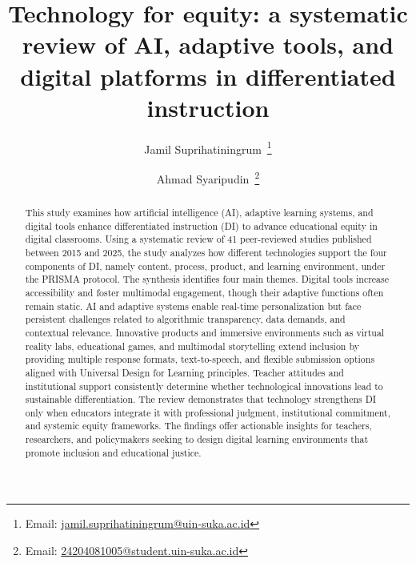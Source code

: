 \documentclass[english]{textolivre}
\title{Technology for equity: a systematic review of AI, adaptive tools, and digital platforms in differentiated instruction}
\author[1]{Jamil Suprihatiningrum~\orcid{0000-0002-1836-8845}\thanks{Email: \href{mailto:jamil.suprihatiningrum@uin-suka.ac.id}{jamil.suprihatiningrum@uin-suka.ac.id}}}
\author[1]{Ahmad Syaripudin~\orcid{0009-0000-5606-0406}\thanks{Email: \href{mailto:24204081005@student.uin-suka.ac.id}{24204081005@student.uin-suka.ac.id}}}
\affil[1]{State Islamic University Sunan Kalijaga, Yogyakarta, Indonesia.}
\begin{document}
\maketitle

\begin{polyabstract}
\begin{abstract}
This study examines how artificial intelligence (AI), adaptive learning systems, and digital tools enhance differentiated instruction (DI) to advance educational equity in digital classrooms. Using a systematic review of 41 peer-reviewed studies published between 2015 and 2025, the study analyzes how different technologies support the four components of DI, namely content, process, product, and learning environment, under the PRISMA protocol. The synthesis identifies four main themes. Digital tools increase accessibility and foster multimodal engagement, though their adaptive functions often remain static. AI and adaptive systems enable real-time personalization but face persistent challenges related to algorithmic transparency, data demands, and contextual relevance. Innovative products and immersive environments such as virtual reality labs, educational games, and multimodal storytelling extend inclusion by providing multiple response formats, text-to-speech, and flexible submission options aligned with Universal Design for Learning principles. Teacher attitudes and institutional support consistently determine whether technological innovations lead to sustainable differentiation. The review demonstrates that technology strengthens DI only when educators integrate it with professional judgment, institutional commitment, and systemic equity frameworks. The findings offer actionable insights for teachers, researchers, and policymakers seeking to design digital learning environments that promote inclusion and educational justice.

\end{abstract}


\end{polyabstract}
\end{document}
